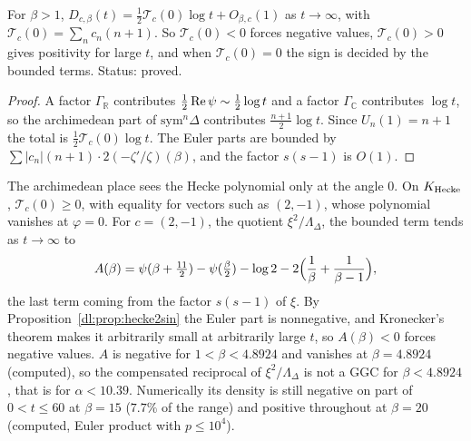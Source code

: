 \begin{theorem}\label{dl:thm:slope}
For $\beta>1$, $D_{c,\beta}(t)=\frac12\mathcal T_c(0)\log t+O_{\beta,c}(1)$ as $t\to\infty$, with $\mathcal T_c(0)=\sum_nc_n(n+1)$. So $\mathcal T_c(0)<0$ forces negative values, $\mathcal T_c(0)>0$ gives positivity for large $t$, and when $\mathcal T_c(0)=0$ the sign is decided by the bounded terms. Status: proved.
\end{theorem}

\begin{proof}
A factor $\Gamma_{\mathbb R}$ contributes $\frac12\operatorname{Re}\psi\sim\frac12\log t$ and a factor $\Gamma_{\mathbb C}$ contributes $\log t$, so the archimedean part of $\mathrm{sym}^n\Delta$ contributes $\frac{n+1}2\log t$. Since $U_n(1)=n+1$ the total is $\frac12\mathcal T_c(0)\log t$. The Euler parts are bounded by $\sum|c_n|(n+1)\cdot2(-\zeta'/\zeta)(\beta)$, and the factor $s(s-1)$ is $O(1)$.
\end{proof}

The archimedean place sees the Hecke polynomial only at the angle $0$. On $K_{\rm Hecke}$, $\mathcal T_c(0)\ge0$, with equality for vectors such as $(2,-1)$, whose polynomial vanishes at $\varphi=0$. For $c=(2,-1)$, the quotient $\xi^2/\Lambda_\Delta$, the bounded term tends as $t\to\infty$ to
\[
A(\beta)=\psi(\beta+\tfrac{11}2)-\psi(\tfrac\beta2)-\log2-2\Bigl(\frac1\beta+\frac1{\beta-1}\Bigr),
\]
the last term coming from the factor $s(s-1)$ of $\xi$. By Proposition~\ref{dl:prop:hecke2sin} the Euler part is nonnegative, and Kronecker's theorem makes it arbitrarily small at arbitrarily large $t$, so $A(\beta)<0$ forces negative values. $A$ is negative for $1<\beta<4.8924$ and vanishes at $\beta=4.8924$ (computed), so the compensated reciprocal of $\xi^2/\Lambda_\Delta$ is not a GGC for $\beta<4.8924$, that is for $\alpha<10.39$. Numerically its density is still negative on part of $0<t\le60$ at $\beta=15$ ($7.7\%$ of the range) and positive throughout at $\beta=20$ (computed, Euler product with $p\le10^4$).

